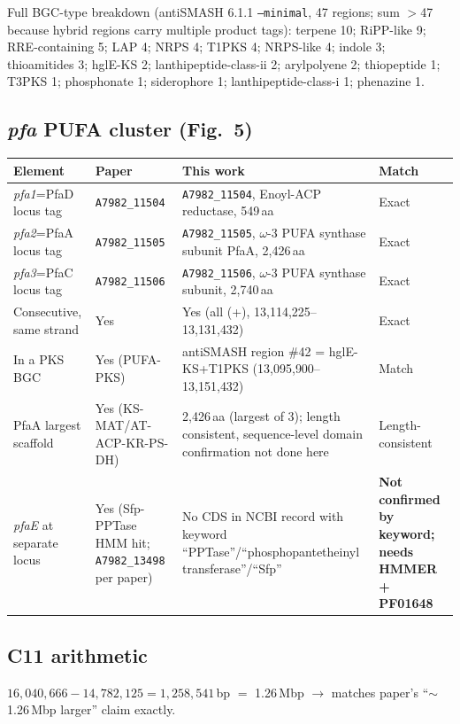 \documentclass[11pt,letterpaper]{article}
\begin{document}
Full BGC-type breakdown (antiSMASH 6.1.1 \texttt{--minimal}, 47 regions; sum $>$47 because hybrid regions carry multiple product tags): terpene 10; RiPP-like 9; RRE-containing 5; LAP 4; NRPS 4; T1PKS 4; NRPS-like 4; indole 3; thioamitides 3; hglE-KS 2; lanthipeptide-class-ii 2; arylpolyene 2; thiopeptide 1; T3PKS 1; phosphonate 1; siderophore 1; lanthipeptide-class-i 1; phenazine 1.

\subsection{\emph{pfa} PUFA cluster (Fig.\ 5)}

\begin{longtable}{@{}p{4.5cm}p{3cm}p{4.5cm}p{2cm}@{}}
\toprule
Element & Paper & This work & Match \\
\midrule
\emph{pfa1}=PfaD locus tag & \texttt{A7982\_11504} & \texttt{A7982\_11504}, Enoyl-ACP reductase, 549\,aa & Exact \\
\emph{pfa2}=PfaA locus tag & \texttt{A7982\_11505} & \texttt{A7982\_11505}, $\omega$-3 PUFA synthase subunit PfaA, 2{,}426\,aa & Exact \\
\emph{pfa3}=PfaC locus tag & \texttt{A7982\_11506} & \texttt{A7982\_11506}, $\omega$-3 PUFA synthase subunit, 2{,}740\,aa & Exact \\
Consecutive, same strand & Yes & Yes (all (+), 13{,}114{,}225--13{,}131{,}432) & Exact \\
In a PKS BGC & Yes (PUFA-PKS) & antiSMASH region \#42 = hglE-KS+T1PKS (13{,}095{,}900--13{,}151{,}432) & Match \\
PfaA largest scaffold & Yes (KS-MAT/AT-ACP-KR-PS-DH) & 2{,}426\,aa (largest of 3); length consistent, sequence-level domain confirmation not done here & Length-consistent \\
\emph{pfaE} at separate locus & Yes (Sfp-PPTase HMM hit; \texttt{A7982\_13498} per paper) & No CDS in NCBI record with keyword ``PPTase''/``phosphopantetheinyl transferase''/``Sfp'' & \textbf{Not confirmed by keyword; needs HMMER + PF01648} \\
\bottomrule
\end{longtable}

\subsection{C11 arithmetic}
$16{,}040{,}666 - 14{,}782{,}125 = 1{,}258{,}541$\,bp $=$ 1.26\,Mbp $\to$ matches paper's ``$\sim$1.26\,Mbp larger'' claim exactly.
\end{document}
